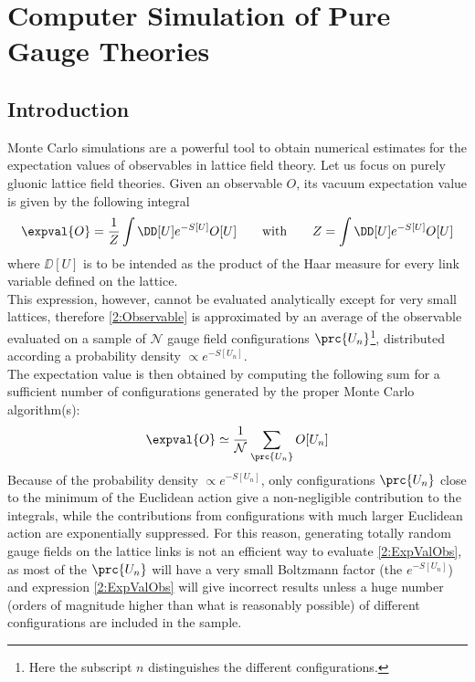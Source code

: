 \pagestyle{myFancy}
\chapter{Computer Simulation of Pure Gauge Theories}
\section{Introduction}
Monte Carlo simulations are a powerful tool to obtain numerical estimates for the expectation values of observables in lattice field theory. Let us focus on purely gluonic lattice field theories. Given an observable $O$, its vacuum expectation value is given by the following integral
\begin{equation}
    \expval{O} = \frac1Z\int\DD[U]e^{-S[U]}O[U] \qquad \text{with} \qquad Z = \int\DD[U]e^{-S[U]}O[U] \label{2:Observable}
\end{equation}
where $\DD[U]$ is to be intended as the product of the Haar measure for every link variable defined on the lattice.\\
This expression, however, cannot be evaluated analytically except for very small lattices, therefore \eqref{2:Observable} is approximated by an average of the observable evaluated on a sample of $\mathcal{N}$ gauge field configurations $\prc{U_n}$\footnote{Here the subscript $n$ distinguishes the different configurations.}, distributed according a probability density $\varpropto e^{-S[U_n]}$.\\
The expectation value is then obtained by computing the following sum for a sufficient number of configurations generated by the proper Monte Carlo algorithm(s):
\begin{equation}
    \expval{O} \simeq \frac{1}{\mathcal{N}} \sum_{\prc{U_n}}O[U_n] \label{2:ExpValObs}
\end{equation}
Because of the probability density $\varpropto e^{-S[U_n]}$, only configurations $\prc{U_n}$ close to the minimum of the Euclidean action give a non-negligible contribution to the integrals, while the contributions from  configurations with much larger Euclidean action are exponentially suppressed.
For this reason, generating totally random gauge fields on the lattice links is not an efficient way to evaluate \eqref{2:ExpValObs}, as most of the $\prc{U_n}$ will have a very small Boltzmann factor (the $e^{-S[U_n]}$) and expression \eqref{2:ExpValObs} will give incorrect results unless a huge number (orders of magnitude higher than what is reasonably possible) of different configurations are included in the sample.\\
